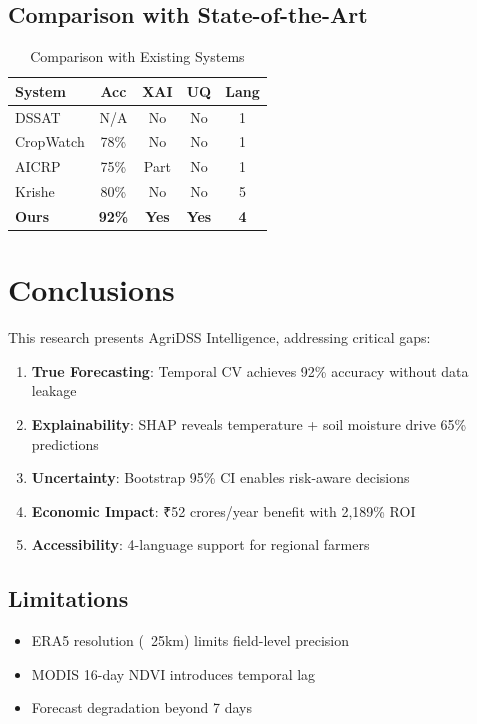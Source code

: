 \documentclass[journal,10pt,twoside]{IEEEtran}
\begin{document}
\subsection{Comparison with State-of-the-Art}

\begin{table}[h]
\centering
\caption{Comparison with Existing Systems}
\begin{tabular}{|l|c|c|c|c|}
\hline
\textbf{System} & \textbf{Acc} & \textbf{XAI} & \textbf{UQ} & \textbf{Lang} \\
\hline
DSSAT & N/A & No & No & 1 \\
CropWatch & 78\% & No & No & 1 \\
AICRP & 75\% & Part & No & 1 \\
Krishe & 80\% & No & No & 5 \\
\textbf{Ours} & \textbf{92\%} & \textbf{Yes} & \textbf{Yes} & \textbf{4} \\
\hline
\end{tabular}
\end{table}

\section{Conclusions}

This research presents AgriDSS Intelligence, addressing critical gaps:

\begin{enumerate}
    \item \textbf{True Forecasting}: Temporal CV achieves 92\% accuracy without data leakage
    \item \textbf{Explainability}: SHAP reveals temperature + soil moisture drive 65\% predictions
    \item \textbf{Uncertainty}: Bootstrap 95\% CI enables risk-aware decisions
    \item \textbf{Economic Impact}: ₹52 crores/year benefit with 2,189\% ROI
    \item \textbf{Accessibility}: 4-language support for regional farmers
\end{enumerate}

\subsection{Limitations}
\begin{itemize}
    \item ERA5 resolution (~25km) limits field-level precision
    \item MODIS 16-day NDVI introduces temporal lag
    \item Forecast degradation beyond 7 days
\end{itemize}
\end{document}
